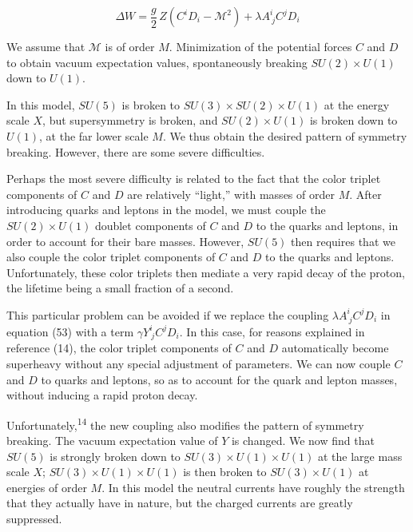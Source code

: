 
\begin{equation}
\Delta W = \frac{g}{2}\, Z \left(C^i D_i - \mathcal{M}^2\right) + \lambda A^i_{\ j} C^j D_i
\tag{53}
\end{equation}

We assume that $\mathcal{M}$ is of order $M$. Minimization of the potential forces
$C$ and $D$ to obtain vacuum expectation values, spontaneously breaking
$SU(2) \times U(1)$ down to $U(1)$.

In this model, $SU(5)$ is broken to $SU(3) \times SU(2) \times U(1)$ at the
energy scale $X$, but supersymmetry is broken, and $SU(2) \times U(1)$ is
broken down to $U(1)$, at the far lower scale $M$. We thus obtain the
desired pattern of symmetry breaking. However, there are some severe
difficulties.

Perhaps the most severe difficulty is related to the fact that
the color triplet components of $C$ and $D$ are relatively ``light,''
with masses of order $M$. After introducing quarks and leptons in the
model, we must couple the $SU(2) \times U(1)$ doublet components of $C$ and $D$
to the quarks and leptons, in order to account for their bare masses.
However, $SU(5)$ then requires that we also couple the color triplet
components of $C$ and $D$ to the quarks and leptons. Unfortunately,
these color triplets then mediate a very rapid decay of the proton,
the lifetime being a small fraction of a second.

This particular problem can be avoided if we replace the coupling
$\lambda A^i_{\ j} C^j D_i$ in equation (53) with a term $\gamma Y^i_{\ j} C^j D_i$. In this case,
for reasons explained in reference (14), the color triplet components
of $C$ and $D$ automatically become superheavy without any special
adjustment of parameters. We can now couple $C$ and $D$ to quarks and
leptons, so as to account for the quark and lepton masses, without
inducing a rapid proton decay.

Unfortunately,\textsuperscript{14} the new coupling also modifies the pattern of
symmetry breaking. The vacuum expectation value of $Y$ is changed.
We now find that $SU(5)$ is strongly broken down to $SU(3) \times U(1) \times U(1)$
at the large mass scale $X$; $SU(3) \times U(1) \times U(1)$ is then broken to
$SU(3) \times U(1)$ at energies of order $M$. In this model the neutral
currents have roughly the strength that they actually have in nature,
but the charged currents are greatly suppressed.


